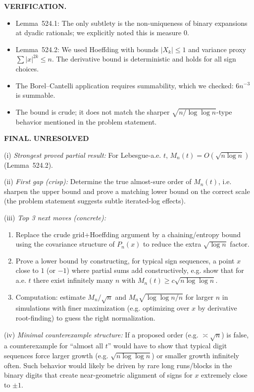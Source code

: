 \bigskip
\noindent\textbf{VERIFICATION.}
\begin{itemize}
\item Lemma~524.1: The only subtlety is the non-uniqueness of binary expansions at dyadic rationals; we explicitly noted this is measure $0$.
\item Lemma~524.2: We used Hoeffding with bounds $|X_k|\le 1$ and variance proxy $\sum |x|^{2k}\le n$. The derivative bound is deterministic and holds for all sign choices.
\item The Borel--Cantelli application requires summability, which we checked: $6n^{-3}$ is summable.
\item The bound is crude; it does not match the sharper $\sqrt{n/\log\log n}$-type behavior mentioned in the problem statement.
\end{itemize}

\bigskip
\noindent\textbf{FINAL.} \textbf{UNRESOLVED}

(i) \emph{Strongest proved partial result:}
For Lebesgue-a.e. $t$, $M_n(t)=O(\sqrt{n\log n})$ (Lemma~524.2).

(ii) \emph{First gap (crisp):}
Determine the true almost-sure order of $M_n(t)$, i.e. sharpen the upper bound and prove a matching lower bound on the correct scale (the problem statement suggests subtle iterated-log effects).

(iii) \emph{Top 3 next moves (concrete):}
\begin{enumerate}
\item Replace the crude grid+Hoeffding argument by a chaining/entropy bound using the covariance structure of $P_n(x)$ to reduce the extra $\sqrt{\log n}$ factor.
\item Prove a lower bound by constructing, for typical sign sequences, a point $x$ close to $1$ (or $-1$) where partial sums add constructively, e.g. show that for a.e. $t$ there exist infinitely many $n$ with $M_n(t)\ge c\sqrt{n\log\log n}$.
\item Computation: estimate $M_n/\sqrt{n}$ and $M_n\sqrt{\log\log n/n}$ for larger $n$ in simulations with finer maximization (e.g. optimizing over $x$ by derivative root-finding) to guess the right normalization.
\end{enumerate}

(iv) \emph{Minimal counterexample structure:}
If a proposed order (e.g. $\asymp \sqrt{n}$) is false, a counterexample for ``almost all $t$'' would have to show that typical digit sequences force larger growth (e.g. $\sqrt{n\log\log n}$) or smaller growth infinitely often. Such behavior would likely be driven by rare long runs/blocks in the binary digits that create near-geometric alignment of signs for $x$ extremely close to $\pm 1$.



